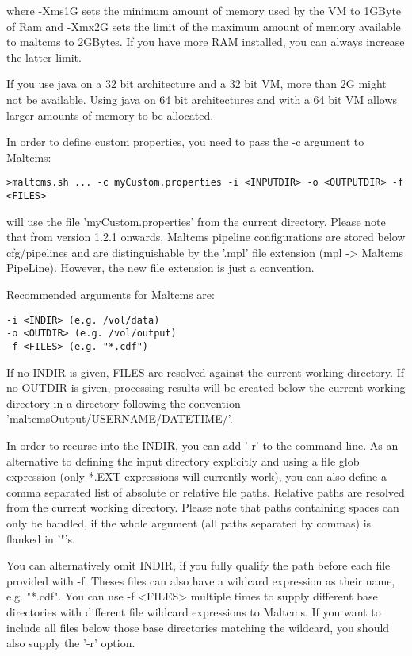 where -Xms1G sets the minimum amount of memory used by the VM to 
1GByte of Ram and -Xmx2G sets the limit of the maximum amount of memory 
available to maltcms to 2GBytes. If you have more RAM installed, you can
always increase the latter limit.

If you use java on a 32 bit architecture and a 32 bit VM, more than 2G 
might not be available. Using java on 64 bit architectures
and with a 64 bit VM allows larger amounts of memory to be
allocated.

In order to define custom properties, you need to pass the -c argument
to Maltcms:

\begin{lstlisting}[style=script]
>maltcms.sh ... -c myCustom.properties -i <INPUTDIR> -o <OUTPUTDIR> -f <FILES>
\end{lstlisting}

will use the file 'myCustom.properties' from the current directory. 
Please note that from version 1.2.1 onwards, Maltcms pipeline configurations
are stored below cfg/pipelines and are distinguishable by the '.mpl' file 
extension (mpl -> Maltcms PipeLine). However, the new file extension is just
a convention.

Recommended arguments for Maltcms are:

\begin{lstlisting}[style=script]
-i <INDIR> (e.g. /vol/data)
-o <OUTDIR> (e.g. /vol/output)
-f <FILES> (e.g. "*.cdf")
\end{lstlisting}

If no INDIR is given, FILES are resolved against the current working
directory. If no OUTDIR is given, processing results will be created
below the current working directory in a directory following the 
convention 'maltcmsOutput/USERNAME/DATETIME/'.

In order to recurse into the INDIR, you can add '-r' to the command
line. As an alternative to defining the input directory explicitly and
using a file glob expression (only *.EXT expressions will currently 
work), you can also define a comma separated list of absolute or 
relative file paths. Relative paths are resolved from the current
working directory. Please note that paths containing spaces can only
be handled, if the whole argument (all paths separated by commas) is
flanked in '"'s. 

You can alternatively omit INDIR, if you fully qualify the path before each 
file provided with -f. Theses files can also have a wildcard expression 
as their name, e.g. "*.cdf". You can use -f <FILES> multiple times to
supply different base directories with different file wildcard expressions
to Maltcms. If you want to include all files below those base directories
matching the wildcard, you should also supply the '-r' option.

